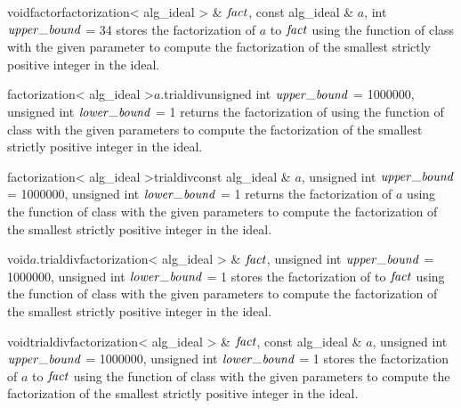 \begin{fcode}{void}{factor}{factorization< alg_ideal > & $\mathit{fact}$,
    const alg_ideal & $a$, int $\upperbound$ = 34}%
  stores the factorization of $a$ to $\mathit{fact}$ using the function  of class
   with the given parameter to compute the factorization of the
  smallest strictly positive integer in the ideal.
\end{fcode}



\begin{cfcode}{factorization< alg_ideal >}{$a$.trialdiv}{unsigned int $\upperbound$ = 1000000,
    unsigned int $\lowerbound$ = 1}%
  returns the factorization of  using the function  of class
   with the given parameters to compute the factorization of the
  smallest strictly positive integer in the ideal.
\end{cfcode}

\begin{fcode}{factorization< alg_ideal >}{trialdiv}{const alg_ideal & $a$,
    unsigned int $\upperbound$ = 1000000, unsigned int $\lowerbound$ = 1}%
  returns the factorization of $a$ using the function  of class
   with the given parameters to compute the factorization of the
  smallest strictly positive integer in the ideal.
\end{fcode}

\begin{cfcode}{void}{$a$.trialdiv}{factorization< alg_ideal > & $\mathit{fact}$,
    unsigned int $\upperbound$ = 1000000, unsigned int $\lowerbound$ = 1}%
  stores the factorization of  to $\mathit{fact}$ using the function  of
  class  with the given parameters to compute the factorization of
  the smallest strictly positive integer in the ideal.
\end{cfcode}

\begin{fcode}{void}{trialdiv}{factorization< alg_ideal > & $\mathit{fact}$, const alg_ideal & $a$,
    unsigned int $\upperbound$ = 1000000, unsigned int $\lowerbound$ = 1}%
  stores the factorization of $a$ to $\mathit{fact}$ using the function  of class
   with the given parameters to compute the factorization of the
  smallest strictly positive integer in the ideal.
\end{fcode}


